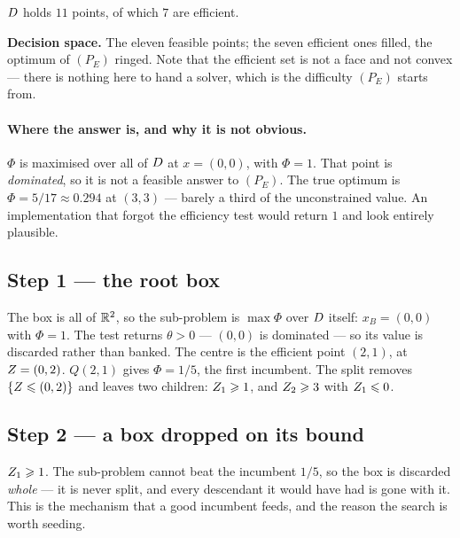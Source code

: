 \documentclass[11pt,a4paper]{article}
\begin{document}
$D$ holds $11$ points, of which $7$ are efficient.

\begin{center}
\end{center}
\noindent
\textbf{Decision space.}  The eleven feasible points; the seven efficient ones
filled, the optimum of $(P_E)$ ringed.  Note that the efficient set is not a
face and not convex --- there is nothing here to hand a solver, which is the
difficulty $(P_E)$ starts from.

\paragraph{Where the answer is, and why it is not obvious.}
$\Phi$ is maximised over all of $D$ at $x = (0,0)$, with $\Phi = 1$.  That
point is \emph{dominated}, so it is not a feasible answer to $(P_E)$.  The true
optimum is $\Phi = 5/17 \approx 0.294$ at $(3,3)$ --- barely a third of the
unconstrained value.  An implementation that forgot the efficiency test would
return $1$ and look entirely plausible.

\subsection*{Step 1 --- the root box}
\begin{center}\end{center}
The box is all of $\mathbb{R}^2$, so the sub-problem is $\max \Phi$ over $D$ itself:
$x_B = (0,0)$ with $\Phi = 1$.  The test returns $\theta > 0$ --- $(0,0)$ is
dominated --- so its value is discarded rather than banked.  The centre is the
efficient point $(2,1)$, at $Z = (0,2)$.  $Q(2,1)$ gives $\Phi = 1/5$, the
first incumbent.  The split removes $\{Z \leqslant (0,2)\}$ and leaves two
children: $Z_1 \geqslant 1$, and $Z_2 \geqslant 3$ with $Z_1 \leqslant 0$.

\subsection*{Step 2 --- a box dropped on its bound}
\begin{center}\end{center}
$Z_1 \geqslant 1$.  The sub-problem cannot beat the incumbent $1/5$, so the box
is discarded \emph{whole} --- it is never split, and every descendant it would
have had is gone with it.  This is the mechanism that a good incumbent feeds,
and the reason the search is worth seeding.
\end{document}

